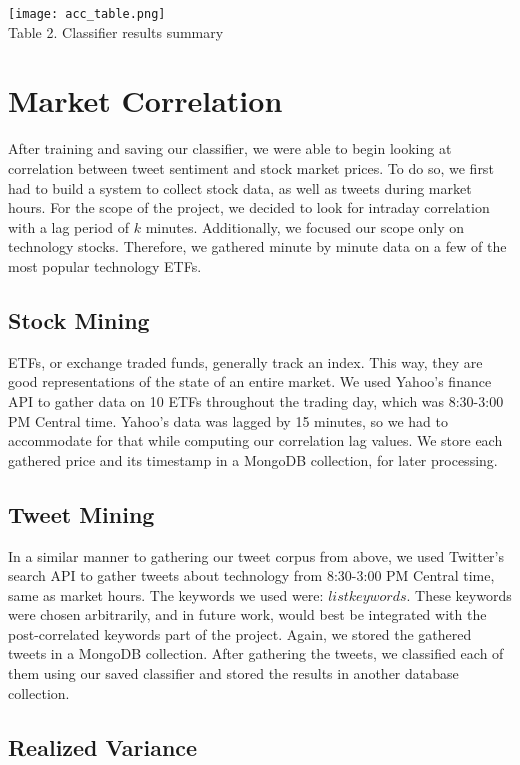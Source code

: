 \documentclass[preprint,pre,floats,aps,amsmath,amssymb,12pt]{revtex4}
\begin{document}
\texttt{[image: acc\_table.png]} \\
Table 2. Classifier results summary

\section{Market Correlation}
\label{sec:corr}

After training and saving our classifier, we were able to begin looking at correlation between tweet sentiment and stock market prices. To do so, we first had to build a system to collect stock data, as well as tweets during market hours. For the scope of the project, we decided to look for intraday correlation with a lag period of $k$ minutes. Additionally, we focused our scope only on technology stocks. Therefore, we gathered minute by minute data on a few of the most popular technology ETFs. 


\subsection{Stock Mining}

ETFs, or exchange traded funds, generally track an index. This way, they are good representations of the state of an entire market. We used Yahoo's finance API to gather data on 10 ETFs throughout the trading day, which was 8:30-3:00 PM Central time. Yahoo's data was lagged by 15 minutes, so we had to accommodate for that while computing our correlation lag values. We store each gathered price and its timestamp in a MongoDB collection, for later processing.

\subsection{Tweet Mining}

In a similar manner to gathering our tweet corpus from above, we used Twitter's search API to gather tweets about technology from 8:30-3:00 PM Central time, same as market hours. The keywords we used were: 
$list keywords$. 
These keywords were chosen arbitrarily, and in future work, would best be integrated with the post-correlated keywords part of the project. 
Again, we stored the gathered tweets in a MongoDB collection. After gathering the tweets, we classified each of them using our saved classifier and stored the results in another database collection. 

\subsection{Realized Variance}
\end{document}
